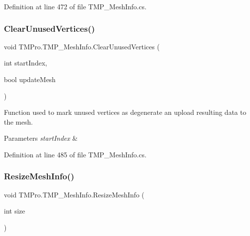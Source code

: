 Definition at line 472 of file T\+M\+P\+\_\+\+Mesh\+Info.\+cs.

\mbox{\label{struct_t_m_pro_1_1_t_m_p___mesh_info_aba0fe3e04e63be7438407d54d7e1c1e8}} 
\subsubsection{\texorpdfstring{ClearUnusedVertices()}{ClearUnusedVertices()}\hspace{0.1cm}{\footnotesize\ttfamily [3/3]}}
{\footnotesize\ttfamily void T\+M\+Pro.\+T\+M\+P\+\_\+\+Mesh\+Info.\+Clear\+Unused\+Vertices (\begin{DoxyParamCaption}\item[{int}]{start\+Index,  }\item[{bool}]{update\+Mesh }\end{DoxyParamCaption})}



Function used to mark unused vertices as degenerate an upload resulting data to the mesh. 


\begin{DoxyParams}{Parameters}
{\em start\+Index} & \\
\hline
\end{DoxyParams}


Definition at line 485 of file T\+M\+P\+\_\+\+Mesh\+Info.\+cs.

\mbox{\label{struct_t_m_pro_1_1_t_m_p___mesh_info_ac2631e006b2107ce543716541a48e5d1}} 
\subsubsection{\texorpdfstring{ResizeMeshInfo()}{ResizeMeshInfo()}\hspace{0.1cm}{\footnotesize\ttfamily [1/2]}}
{\footnotesize\ttfamily void T\+M\+Pro.\+T\+M\+P\+\_\+\+Mesh\+Info.\+Resize\+Mesh\+Info (\begin{DoxyParamCaption}\item[{int}]{size }\end{DoxyParamCaption})}



